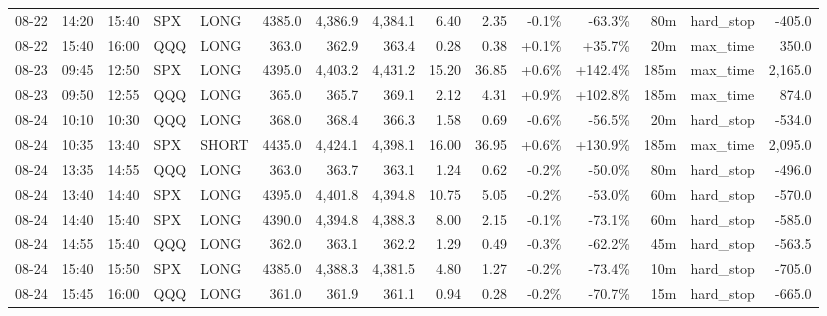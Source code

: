 \documentclass[11pt,a4paper,twoside]{article}
\begin{document}
\begin{landscape}
\begin{center}
\begin{longtable}{>{\color{txtmain}}l l l l l r r r r r r r r >{\color{txtmain}}l r}
08-22 & 14:20 & 15:40 & SPX & LONG & 4385.0 & 4,386.9 & 4,384.1 & 6.40 & 2.35 & \textcolor{lossred}{-0.1\%} & \textcolor{lossred}{-63.3\%} & 80m & hard\_stop & \textcolor{lossred}{-405.0} \\
08-22 & 15:40 & 16:00 & QQQ & LONG & 363.0 & 362.9 & 363.4 & 0.28 & 0.38 & \textcolor{wingreen}{+0.1\%} & \textcolor{wingreen}{+35.7\%} & 20m & max\_time & \textcolor{wingreen}{350.0} \\
08-23 & 09:45 & 12:50 & SPX & LONG & 4395.0 & 4,403.2 & 4,431.2 & 15.20 & 36.85 & \textcolor{wingreen}{+0.6\%} & \textcolor{wingreen}{+142.4\%} & 185m & max\_time & \textcolor{wingreen}{2,165.0} \\
08-23 & 09:50 & 12:55 & QQQ & LONG & 365.0 & 365.7 & 369.1 & 2.12 & 4.31 & \textcolor{wingreen}{+0.9\%} & \textcolor{wingreen}{+102.8\%} & 185m & max\_time & \textcolor{wingreen}{874.0} \\
08-24 & 10:10 & 10:30 & QQQ & LONG & 368.0 & 368.4 & 366.3 & 1.58 & 0.69 & \textcolor{lossred}{-0.6\%} & \textcolor{lossred}{-56.5\%} & 20m & hard\_stop & \textcolor{lossred}{-534.0} \\
08-24 & 10:35 & 13:40 & SPX & SHORT & 4435.0 & 4,424.1 & 4,398.1 & 16.00 & 36.95 & \textcolor{wingreen}{+0.6\%} & \textcolor{wingreen}{+130.9\%} & 185m & max\_time & \textcolor{wingreen}{2,095.0} \\
08-24 & 13:35 & 14:55 & QQQ & LONG & 363.0 & 363.7 & 363.1 & 1.24 & 0.62 & \textcolor{lossred}{-0.2\%} & \textcolor{lossred}{-50.0\%} & 80m & hard\_stop & \textcolor{lossred}{-496.0} \\
08-24 & 13:40 & 14:40 & SPX & LONG & 4395.0 & 4,401.8 & 4,394.8 & 10.75 & 5.05 & \textcolor{lossred}{-0.2\%} & \textcolor{lossred}{-53.0\%} & 60m & hard\_stop & \textcolor{lossred}{-570.0} \\
08-24 & 14:40 & 15:40 & SPX & LONG & 4390.0 & 4,394.8 & 4,388.3 & 8.00 & 2.15 & \textcolor{lossred}{-0.1\%} & \textcolor{lossred}{-73.1\%} & 60m & hard\_stop & \textcolor{lossred}{-585.0} \\
08-24 & 14:55 & 15:40 & QQQ & LONG & 362.0 & 363.1 & 362.2 & 1.29 & 0.49 & \textcolor{lossred}{-0.3\%} & \textcolor{lossred}{-62.2\%} & 45m & hard\_stop & \textcolor{lossred}{-563.5} \\
08-24 & 15:40 & 15:50 & SPX & LONG & 4385.0 & 4,388.3 & 4,381.5 & 4.80 & 1.27 & \textcolor{lossred}{-0.2\%} & \textcolor{lossred}{-73.4\%} & 10m & hard\_stop & \textcolor{lossred}{-705.0} \\
08-24 & 15:45 & 16:00 & QQQ & LONG & 361.0 & 361.9 & 361.1 & 0.94 & 0.28 & \textcolor{lossred}{-0.2\%} & \textcolor{lossred}{-70.7\%} & 15m & hard\_stop & \textcolor{lossred}{-665.0} \\

\end{longtable}
\end{center}
\end{landscape}
\end{document}
